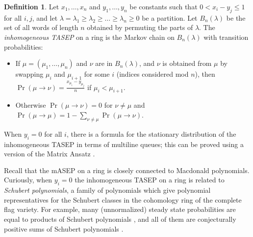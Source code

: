 \documentclass[11pt]{amsart}
\theoremstyle{definition}
\newtheorem{definition}[theorem]{Definition}
\theoremstyle{remark}
\begin{document}
	\begin{definition}
		Let $x_1,\dots,x_n$ and $y_1,\dots,y_n$ be constants
such that $0<x_i-y_j\leq 1$ for all $i,j$, 
and let $\lambda = \lambda_1 \geq \lambda_2 \geq \dots 
\geq \lambda_n \geq 0$
be a partition. 
Let ${B}_n(\lambda)$
 be the set of all words of length $n$
obtained by permuting the parts of $\lambda$.
The \emph{inhomogeneous TASEP}
on a ring
is the Markov chain on ${B}_n(\lambda)$
      with transition probabilities:
\begin{itemize}
\item If $\mu = (\mu_1,\dots,\mu_n)$ and $\nu$ 
	are in ${B}_n(\lambda)$,
	and $\nu$ is obtained from $\mu$ by swapping
	$\mu_i$ and $\mu_{i+1}$ for some $i$
	(indices considered mod $n$), 
then
		$\Pr(\mu \to \nu) = \frac{x_{\mu_i}-y_{\mu_j}}{n}$ if $\mu_i<\mu_{i+1}$.
\item Otherwise $\Pr(\mu \to \nu) = 0$ for $\nu \neq \mu$ and
	$\Pr(\mu \to \mu) = 1-\sum_{\nu \neq \mu} \Pr(\mu \to \nu)$.
\end{itemize}
\end{definition}

When $y_i=0$ for all $i$, there is a 
formula for the stationary distribution of the 
inhomogeneous TASEP in terms of multiline queues; this can 
be proved using a version of the Matrix Ansatz
\cite{AritaMallick}.

Recall that the mASEP on a ring is closely connected to 
Macdonald polynomials.  Curiously, when $y_i=0$ the inhomogeneous TASEP on a ring
is related to \emph{Schubert polynomials}, a family of polynomials which give
polynomial representatives for the Schubert classes in the 
cohomology ring of  the 
complete flag variety.  For example, many (unnormalized) steady 
state probabilities are equal to products of Schubert polynomials
\cite{Cantini2, KW}, and all of them are conjecturally  
positive sums of Schubert polynomials \cite{LW}.
\end{document}
